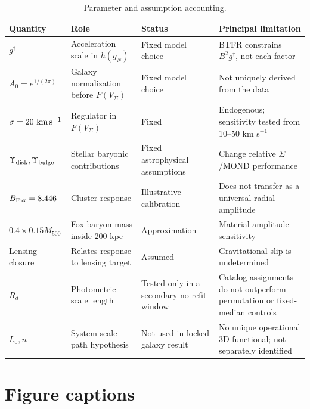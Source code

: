 \documentclass[utf8]{FrontiersinHarvard}
\begin{document}
\begin{table}[h!]
\centering
\caption{Parameter and assumption accounting.}\label{tab:parameters}
\scriptsize
\begin{tabularx}{\textwidth}{>{\raggedright\arraybackslash}p{}>{\raggedright\arraybackslash}p{}>{\raggedright\arraybackslash}p{}>{\raggedright\arraybackslash}X}
\toprule
Quantity & Role & Status & Principal limitation \\
\midrule
\(g^\dagger\) & Acceleration scale in \(h(g_N)\) & Fixed model choice & BTFR constrains \(B^2g^\dagger\), not each factor \\
\(A_0=e^{1/(2\pi)}\) & Galaxy normalization before \(F(V_\Sigma)\) & Fixed model choice & Not uniquely derived from the data \\
\(\sigma=20\ {\rm km\,s^{-1}}\) & Regulator in \(F(V_\Sigma)\) & Fixed & Endogenous; sensitivity tested from 10--50 km s\(^{-1}\) \\
\(\Upsilon_{\rm disk},\Upsilon_{\rm bulge}\) & Stellar baryonic contributions & Fixed astrophysical assumptions & Change relative \(\Sigma\)/MOND performance \\
\(B_{\rm Fox}=8.446\) & Cluster response & Illustrative calibration & Does not transfer as a universal radial amplitude \\
\(0.4\times0.15M_{500}\) & Fox baryon mass inside 200 kpc & Approximation & Material amplitude sensitivity \\
Lensing closure & Relates response to lensing target & Assumed & Gravitational slip is undetermined \\
\(R_d\) & Photometric scale length & Tested only in a secondary no-refit window & Catalog assignments do not outperform permutation or fixed-median controls \\
\(L_0,n\) & System-scale path hypothesis & Not used in locked galaxy result & No unique operational 3D functional; not separately identified \\
\bottomrule
\end{tabularx}
\end{table}

\section*{Figure captions}
\end{document}
